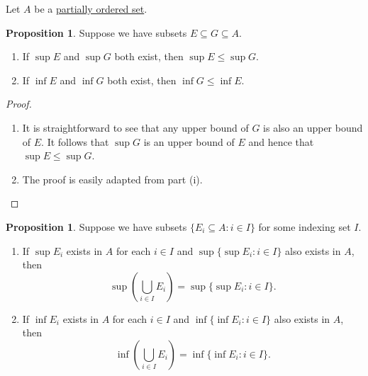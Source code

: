 \documentclass[12pt]{article}
\theoremstyle{definition}
\newtheorem{proposition}[definition]{Proposition}
\begin{document}
Let \( A \) be a \href{https://en.wikipedia.org/wiki/Partially_ordered_set}{partially ordered set}.

\begin{proposition}
\label{prop:subset_implies_sup/inf_order}
    Suppose we have subsets \( E \subseteq G \subseteq A \).
    \begin{enumerate}[label = (\roman*)]
        \item If \( \sup E \) and \( \sup G \) both exist, then \( \sup E \leq \sup G \).
        
        \item If \( \inf E \) and \( \inf G \) both exist, then \( \inf G \leq \inf E \).
    \end{enumerate}
\end{proposition}

\begin{proof}
    \begin{enumerate}[label = (\roman*)]
        \item It is straightforward to see that any upper bound of \( G \) is also an upper bound of \( E \). It follows that \( \sup G \) is an upper bound of \( E \) and hence that \( \sup E \leq \sup G \).

        \item The proof is easily adapted from part (i). \qedhere
    \end{enumerate}
\end{proof}

\begin{proposition}
\label{prop:sup_inf_unions_partial_order}
    Suppose we have subsets \( \{ E_i \subseteq A : i \in I \} \) for some indexing set \( I \).
    
    \begin{enumerate}[label = (\roman*)]
        \item If \( \sup E_i \) exists in \( A \) for each \( i \in I \) and \( \sup \{ \sup E_i : i \in I \} \) also exists in \( A \), then
        \[
            \textstyle{\sup \left( \bigcup_{i \in I} E_i \right) = \sup \{ \sup E_i : i \in I \}.}
        \]

        \item If \( \inf E_i \) exists in \( A \) for each \( i \in I \) and \( \inf \{ \inf E_i : i \in I \} \) also exists in \( A \), then
        \[
            \textstyle{\inf \left( \bigcup_{i \in I} E_i \right) = \inf \{ \inf E_i : i \in I \}.}
        \]
    \end{enumerate}
\end{proposition}
\end{document}
